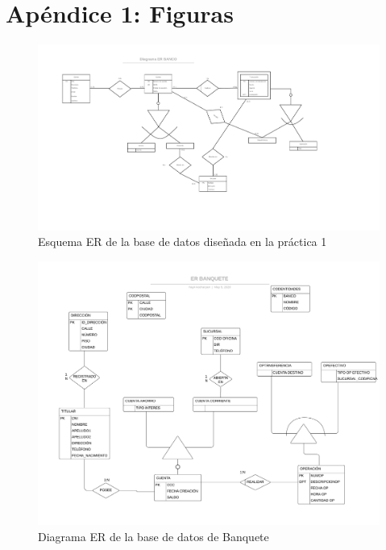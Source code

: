 \documentclass{article}
\begin{document}
\section{Apéndice 1: Figuras}

\begin{landscape}
\begin{figure}
\centering
\includegraphics[scale=0.75]{images/er_practica1.png}
\caption{Esquema ER de la base de datos diseñada en la práctica 1}
\label{fig:er1}
\end{figure}
\end{landscape}




\newpage
\begin{landscape}
\begin{figure}
\centering
\includegraphics[scale=0.75]{images/ER_BANQUETE.jpeg}
\caption{Diagrama ER de la base de datos de Banquete}
\label{fig:er_banquete}
\end{figure}
\end{landscape}
\pagebreak
\end{document}
